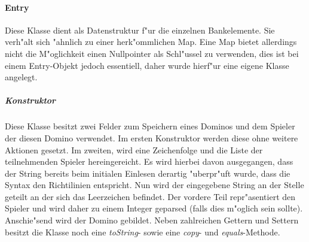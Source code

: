 \paragraph{Entry}
\label{par:entry}
Diese Klasse dient als Datenstruktur f"ur die einzelnen Bankelemente. Sie verh"alt sich "ahnlich zu einer herk"ommlichen Map. Eine Map bietet allerdings nicht die M"oglichkeit einen Nullpointer als Schl"ussel zu verwenden, dies ist bei einem Entry-Objekt jedoch essentiell, daher wurde hierf"ur eine eigene Klasse angelegt. 

\subparagraph{Konstruktor}
Diese Klasse besitzt zwei Felder zum Speichern eines Dominos und dem Spieler der diesen Domino verwendet. Im ersten Konstruktor werden diese ohne weitere Aktionen gesetzt. Im zweiten, wird eine Zeichenfolge und die Liste der teilnehmenden Spieler hereingereicht. Es wird hierbei davon ausgegangen, dass der String bereits beim initialen Einlesen derartig "uberpr"uft wurde, dass die Syntax den Richtilinien entspricht. Nun wird der eingegebene String an der Stelle geteilt an der sich das Leerzeichen befindet. Der vordere Teil repr"asentiert den Spieler und wird daher zu einem Integer geparsed (falls dies m"oglich sein sollte). Anschie"send wird der Domino gebildet. Neben zahlreichen Gettern und Settern besitzt die Klasse noch eine \emph{toString}- sowie eine \emph{copy}- und \emph{equals}-Methode. 
